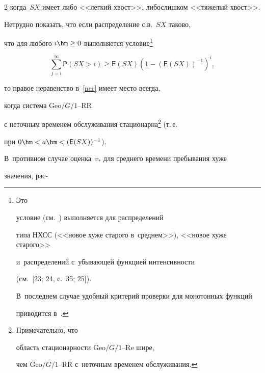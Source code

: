 \begin{multicols}{2}
когда~$SX$ имеет либо <<легкий хвост>>, либо\linebreak слишком <<тяжелый хвост>>.



Нетрудно показать, что если распределение с.в.~$SX$ таково,

что для любого $i\hm\ge 0$ выполняется условие\footnote[3]{Это

условие (см.~\cite{new8-2}) выполняется для распределений

типа НХСС (<<новое хуже старого в~среднем>>), <<новое хуже старого>>

и~распределений с~убывающей функцией интенсивности 

(см.~[23; 24, с.~35; 25]).

В~последнем случае удобный критерий проверки для монотонных функций

 приводится в~\cite[Proposition~1]{Conti}.}

$$

\sum\limits_{j=i}^\infty \mathsf{P}({SX}>i)

\ge \mathsf{E}(SX)\left (1 - (\mathsf{E}(SX))^{-1}\right )^i,

$$

то правое неравенство в~\eqref{ner} имеет место всегда,

когда сис\-те\-ма $\mathrm{Geo}/G/1$--RR

с неточным временем обслуживания стационарна\footnote[4]{Примечательно, что 

область стационарности $\mathrm{Geo}/G/1$--Re шире,

чем $\mathrm{Geo}/G/1$--RR с~неточным временем обслуживания.} (т.\,е.\

 при $0\hm<a \hm<(\mathsf{E}(SX))^{-1}$).

В~противном случае оценка~$v_*$ для среднего времени пребывания хуже

значения, рас-\linebreak\vspace*{-12pt}



\pagebreak







\end{multicols}



